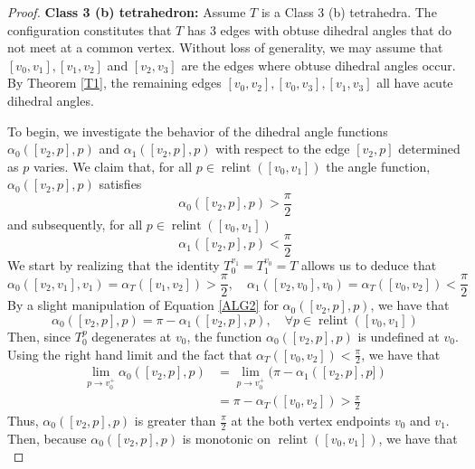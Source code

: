 \documentclass{mainresearch}
\begin{document}
\begin{proof}
	
	
	
	\bigskip
	
	\noindent\textbf{Class 3 (b) tetrahedron:} Assume $T$ is a Class 3 (b) tetrahedra. The configuration constitutes that $T$ has 3 edges with obtuse dihedral angles that do not meet at a common vertex. Without loss of generality, we may assume that $[v_0,v_1], [v_1,v_2]$ and $[v_2,v_3]$ are the edges where obtuse dihedral angles occur. By Theorem \ref{T1}, the remaining edges $[v_0,v_2],[v_0,v_3],[v_1,v_3]$ all have acute dihedral angles. 
	
	
	To begin, we investigate the behavior of the dihedral angle functions $\alpha_0([v_2,p],p)$ and $\alpha_1([v_2,p],p)$ with respect to the edge $[v_2,p]$ determined as $p$ varies. We claim that, for all $p \in \operatorname{relint}([v_0,v_1])$ the angle function, $\alpha_0([v_2,p],p)$ satisfies
	\begin{equation*}
		\alpha_0([v_2,p],p) > \frac{\pi}{2}
	\end{equation*}
	and subsequently, for all $p\in \operatorname{relint}([v_0,v_1])$
	\begin{equation*}
		\alpha_1([v_2,p],p) < \frac{\pi}{2}
	\end{equation*}
	We start by realizing that the identity $T_0^{v_1} = T_1^{v_0}=T$ allows us to deduce that
	\begin{equation*}
		\alpha_0([v_2,v_1],v_1) = \alpha_T([v_1,v_2]) >\frac{\pi}{2},\quad \alpha_1([v_2,v_0],v_0) = \alpha_T([v_0,v_2]) <\frac{\pi}{2}
	\end{equation*}
	By a slight manipulation of Equation \ref{ALG2} for $\alpha_0([v_2,p],p)$, we have that
	\begin{equation*}
		\alpha_0([v_2,p],p) = \pi- \alpha_1([v_2,p],p), \quad \forall p \in \operatorname{relint}([v_0,v_1])
	\end{equation*}
	Then, since $T_0^p$ degenerates at $v_0$, the function $\alpha_0([v_2,p],p)$ is undefined at $v_0$. Using the right hand limit and the fact that $\alpha_T([v_0,v_2]) < \frac{\pi}{2}$, we have that
	\begin{align*}
		\lim_{p\to v_0^+}\alpha_0([v_2,p],p) &=\lim_{p \to v_0^+}( \pi - \alpha_1([v_2,p],p]) \\
		&= \pi - \alpha_T([v_0,v_2]) > \frac{\pi}{2}
	\end{align*}
	Thus, $\alpha_0([v_2,p],p)$ is greater than $\frac{\pi}{2}$ at the both vertex endpoints $v_0$ and $v_1$. Then, because $\alpha_0([v_2,p],p)$ is monotonic on $\operatorname{relint}([v_0,v_1])$, we have that 
	\begin{equation*}

\end{equation*}
\end{proof}
\end{document}
